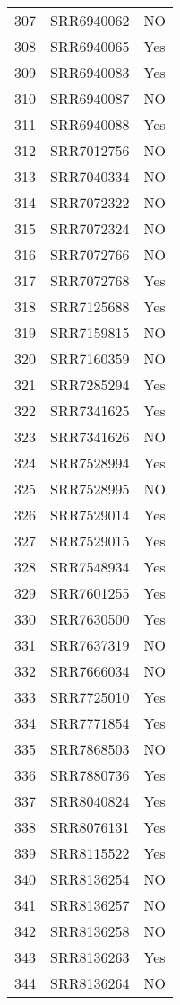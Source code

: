 \begin{table}[ht]
\begin{tabular}{rll}
  307 & SRR6940062 & NO \\ 
  308 & SRR6940065 & Yes \\ 
  309 & SRR6940083 & Yes \\ 
  310 & SRR6940087 & NO \\ 
  311 & SRR6940088 & Yes \\ 
  312 & SRR7012756 & NO \\ 
  313 & SRR7040334 & NO \\ 
  314 & SRR7072322 & NO \\ 
  315 & SRR7072324 & NO \\ 
  316 & SRR7072766 & NO \\ 
  317 & SRR7072768 & Yes \\ 
  318 & SRR7125688 & Yes \\ 
  319 & SRR7159815 & NO \\ 
  320 & SRR7160359 & NO \\ 
  321 & SRR7285294 & Yes \\ 
  322 & SRR7341625 & Yes \\ 
  323 & SRR7341626 & NO \\ 
  324 & SRR7528994 & Yes \\ 
  325 & SRR7528995 & NO \\ 
  326 & SRR7529014 & Yes \\ 
  327 & SRR7529015 & Yes \\ 
  328 & SRR7548934 & Yes \\ 
  329 & SRR7601255 & Yes \\ 
  330 & SRR7630500 & Yes \\ 
  331 & SRR7637319 & NO \\ 
  332 & SRR7666034 & NO \\ 
  333 & SRR7725010 & Yes \\ 
  334 & SRR7771854 & Yes \\ 
  335 & SRR7868503 & NO \\ 
  336 & SRR7880736 & Yes \\ 
  337 & SRR8040824 & Yes \\ 
  338 & SRR8076131 & Yes \\ 
  339 & SRR8115522 & Yes \\ 
  340 & SRR8136254 & NO \\ 
  341 & SRR8136257 & NO \\ 
  342 & SRR8136258 & NO \\ 
  343 & SRR8136263 & Yes \\ 
  344 & SRR8136264 & NO \\ 

\end{tabular}
\end{table}
